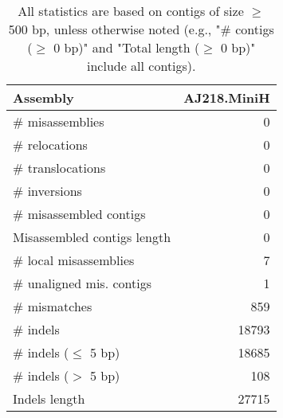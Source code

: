 \documentclass[12pt,a4paper]{article}
\begin{document}
\begin{table}[ht]
\begin{center}
\caption{All statistics are based on contigs of size $\geq$ 500 bp, unless otherwise noted (e.g., "\# contigs ($\geq$ 0 bp)" and "Total length ($\geq$ 0 bp)" include all contigs).}
\begin{tabular}{|l*{1}{|r}|}
\hline
Assembly & AJ218.MiniH \\ \hline
\# misassemblies & 0 \\ \hline
\hspace{5mm}\# relocations & 0 \\ \hline
\hspace{5mm}\# translocations & 0 \\ \hline
\hspace{5mm}\# inversions & 0 \\ \hline
\# misassembled contigs & 0 \\ \hline
Misassembled contigs length & 0 \\ \hline
\# local misassemblies & 7 \\ \hline
\# unaligned mis. contigs & 1 \\ \hline
\# mismatches & 859 \\ \hline
\# indels & 18793 \\ \hline
\hspace{5mm}\# indels ($\leq$ 5 bp) & 18685 \\ \hline
\hspace{5mm}\# indels ($>$ 5 bp) & 108 \\ \hline
Indels length & 27715 \\ \hline
\end{tabular}
\end{center}
\end{table}
\end{document}
